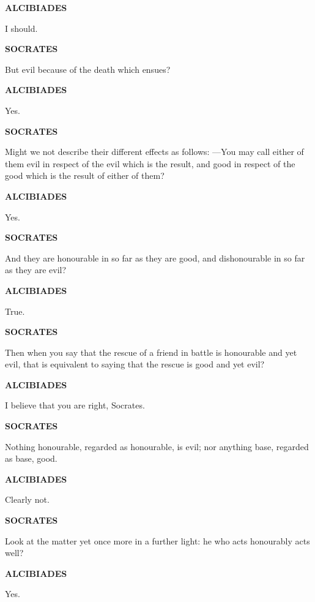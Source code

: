 \documentclass[11pt,letter]{article}
\begin{document}
\par \textbf{ALCIBIADES}
\par   I should.

\par \textbf{SOCRATES}
\par   But evil because of the death which ensues?

\par \textbf{ALCIBIADES}
\par   Yes.

\par \textbf{SOCRATES}
\par   Might we not describe their different effects as follows: —You may call either of them evil in respect of the evil which is the result, and good in respect of the good which is the result of either of them?

\par \textbf{ALCIBIADES}
\par   Yes.

\par \textbf{SOCRATES}
\par   And they are honourable in so far as they are good, and dishonourable in so far as they are evil?

\par \textbf{ALCIBIADES}
\par   True.

\par \textbf{SOCRATES}
\par   Then when you say that the rescue of a friend in battle is honourable and yet evil, that is equivalent to saying that the rescue is good and yet evil?

\par \textbf{ALCIBIADES}
\par   I believe that you are right, Socrates.

\par \textbf{SOCRATES}
\par   Nothing honourable, regarded as honourable, is evil; nor anything base, regarded as base, good.

\par \textbf{ALCIBIADES}
\par   Clearly not.

\par \textbf{SOCRATES}
\par   Look at the matter yet once more in a further light:  he who acts honourably acts well?

\par \textbf{ALCIBIADES}
\par   Yes.
\end{document}
